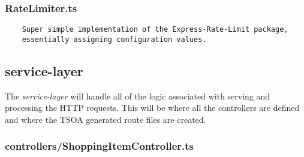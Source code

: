 \subsubsection{RateLimiter.ts}

\begin{verbatim}
    Super simple implementation of the Express-Rate-Limit package,
    essentially assigning configuration values.
\end{verbatim}
\subsection{service-layer}
The \emph{service-layer} will handle all of the logic associated with serving and processing the HTTP requests. This will be where all the controllers are defined and where the TSOA generated route files are created.
\subsubsection{controllers/ShoppingItemController.ts}
